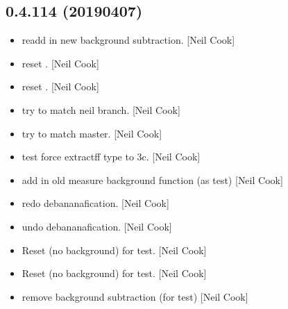 \documentclass[a4paper,10pt,english]{report}
\begin{document}
\subsection{0.4.114 (2019\sphinxhyphen{}04\sphinxhyphen{}07)}
\label{\detokenize{misc/changelog:id166}}\begin{itemize}
\item {} 
 \sphinxhyphen{} re\sphinxhyphen{}add in new background subtraction. {[}Neil
Cook{]}

\item {} 
 \sphinxhyphen{} reset . {[}Neil Cook{]}

\item {} 
 \sphinxhyphen{} reset . {[}Neil Cook{]}

\item {} 
 \sphinxhyphen{} try to match neil branch. {[}Neil Cook{]}

\item {} 
 \sphinxhyphen{} try to match master. {[}Neil Cook{]}

\item {} 
 \sphinxhyphen{} test force extractff type to 3c. {[}Neil Cook{]}

\item {} 
 \sphinxhyphen{} add in old measure background function (as test) {[}Neil
Cook{]}

\item {} 
 \sphinxhyphen{} redo debananafication. {[}Neil Cook{]}

\item {} 
 \sphinxhyphen{} undo debananafication. {[}Neil Cook{]}

\item {} 
Reset  (no background) for test. {[}Neil Cook{]}

\item {} 
Reset  (no background) for test. {[}Neil Cook{]}

\item {} 
 \sphinxhyphen{} remove background subtraction (for test) {[}Neil
Cook{]}

\end{itemize}
\end{document}
